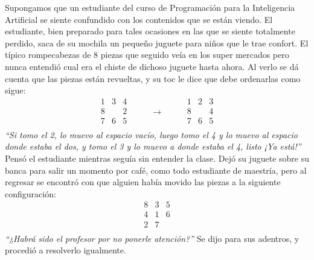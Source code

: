\begin{enumerate}
\begin{solution}
        Supongamos que un estudiante del curso de Programación para la Inteligencia Artificial se siente confundido con los contenidos que se están viendo. El estudiante, bien preparado para tales ocasiones en las que se siente totalmente perdido, saca de su mochila un pequeño juguete para niños que le trae confort. El típico rompecabezas de 8 piezas que seguido veía en los super mercados pero nunca entendió cual era el chiste de dichoso juguete hasta ahora. Al verlo se dá cuenta que las piezas están revueltas, y su toc le dice que debe ordenarlas como sigue:
        \begin{equation}
            \begin{matrix}
                1 & 3 & 4 \\
                8 &   & 2 \\
                7 & 6 & 5 \\
            \end{matrix}
            \hspace{1cm}
            \to
            \hspace{1cm}
            \begin{matrix}
                1 & 2 & 3 \\
                8 &   & 4 \\
                7 & 6 & 5 \\
            \end{matrix}
            \label{eq:easy}
        \end{equation}
        \textit{``Si tomo el 2, lo muevo al espacio vacío, luego tomo el 4 y lo muevo al espacio donde estaba el dos, y tomo el 3 y lo muevo a donde estaba el 4, listo ¡Ya está!''} Pensó el estudiante mientras seguía sin entender la clase. Dejó su juguete sobre su banca para salir un momento por café, como todo estudiante de maestría, pero al regresar se encontró con que alguien había movido las piezas a la siguiente configuración:
        \begin{equation}
            \begin{matrix}
                8 & 3 & 5 \\
                4 & 1 & 6 \\
                2 & 7 &   \\
            \end{matrix}
            \label{eq:notsoeasy}
        \end{equation}
        \textit{``¿Habrá sido el profesor por no ponerle atención?''} Se dijo para sus adentros, y procedió a resolverlo igualmente.


\end{solution}
\end{enumerate}
